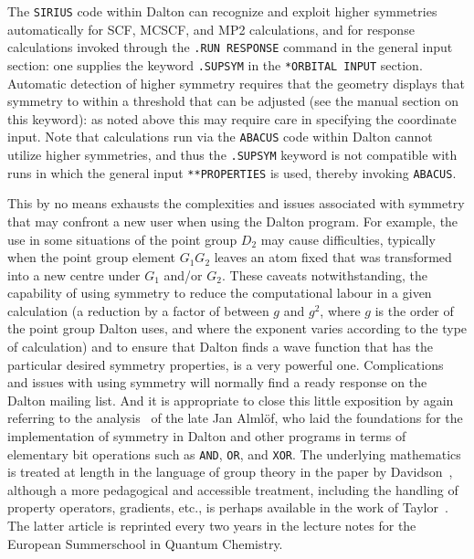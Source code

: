 The \verb|SIRIUS| code within Dalton can recognize and exploit higher
symmetries automatically for SCF, MCSCF, and MP2 calculations, and for
response calculations invoked through the \verb|.RUN RESPONSE| command
in the general input section: one supplies the keyword \verb|.SUPSYM|
in the \verb|*ORBITAL INPUT| section.  Automatic detection of higher
symmetry requires that the geometry displays that symmetry to within a
threshold that can be adjusted (see the manual section on this
keyword): as noted above this may require care in specifying the
coordinate input.  Note that calculations run via the \verb|ABACUS|
code within Dalton cannot utilize higher symmetries, and thus the
\verb|.SUPSYM| keyword is not compatible with runs in which the
general input \verb|**PROPERTIES| is used, thereby invoking
\verb|ABACUS|.

This by no means exhausts the complexities and issues associated with
symmetry that may confront a new user when using the Dalton program.
For example, the use in some situations of the point group $D_2$ may
cause difficulties, typically when the point group element $G_1G_2$
leaves an atom fixed that was transformed into a new centre under
$G_1$ and/or $G_2$.
These caveats notwithstanding, the capability of using symmetry to
reduce the computational labour in a given calculation (a reduction by
a factor of between $g$ and $g^2$, where $g$ is the order of the point
group Dalton uses, and where the exponent varies according to the type
of calculation) and to ensure that Dalton finds a wave function that
has the particular desired symmetry properties, is a very powerful
one.  Complications and issues with using symmetry will normally find
a ready response on the Dalton mailing list.  And it is appropriate to
close this little exposition by again referring to the
analysis~\cite{Alm72} of the
late Jan Alml{\"o}f, who laid the foundations for the implementation
of symmetry in Dalton and other programs in terms of elementary bit
operations such as \verb|AND|, \verb|OR|, and \verb|XOR|.  The
underlying mathematics is treated at length in the language of group
theory in the paper by Davidson~\cite{Dav75a}, although a more pedagogical and
accessible treatment, including the handling of property operators,
gradients, etc., is perhaps available in the work of
Taylor~\cite{Tay92}.  The latter article is reprinted every two years
in the lecture notes for the European Summerschool in Quantum
Chemistry.

